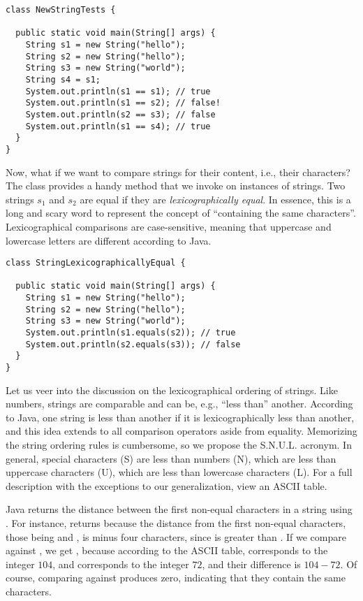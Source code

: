 \begin{cl}[]{}
\begin{lstlisting}[language=MyJava]
class NewStringTests {

  public static void main(String[] args) {
    String s1 = new String("hello");
    String s2 = new String("hello");
    String s3 = new String("world");
    String s4 = s1;
    System.out.println(s1 == s1); // true
    System.out.println(s1 == s2); // false!
    System.out.println(s2 == s3); // false
    System.out.println(s1 == s4); // true
  }
}
\end{lstlisting}
\end{cl}

Now, what if we want to compare strings for their content, i.e., their characters? The  class provides a handy  method that we invoke on instances of strings. Two strings $s_1$ and $s_2$ are equal if they are \textit{lexicographically equal}. In essence, this is a long and scary word to represent the concept of ``containing the same characters''. Lexicographical comparisons are case-sensitive, meaning that uppercase and lowercase letters are different according to Java.

\begin{cl}[]{}
\begin{lstlisting}[language=MyJava]
class StringLexicographicallyEqual {

  public static void main(String[] args) {
    String s1 = new String("hello");
    String s2 = new String("hello");
    String s3 = new String("world");
    System.out.println(s1.equals(s2)); // true
    System.out.println(s2.equals(s3)); // false
  }
}
\end{lstlisting}
\end{cl}

Let us veer into the discussion on the lexicographical ordering of strings. Like numbers, strings are comparable and can be, e.g., ``less than'' another. According to Java, one string is less than another if it is lexicographically less than another, and this idea extends to all comparison operators aside from equality. Memorizing the string ordering rules is cumbersome, so we propose the S.N.U.L. acronym. In general, special characters (S) are less than numbers (N), which are less than uppercase characters (U), which are less than lowercase characters (L). For a full description with the exceptions to our generalization, view an ASCII table. 

\example Java returns the distance between the first non-equal characters in a string using . For instance,  returns  because the distance from the first non-equal characters, those being  and , is minus four characters, since  is greater than . If we compare  against , we get , because according to the ASCII table,  corresponds to the integer $104$, and  corresponds to the integer $72$, and their difference is $104 - 72$. Of course, comparing  against  produces zero, indicating that they contain the same characters.

